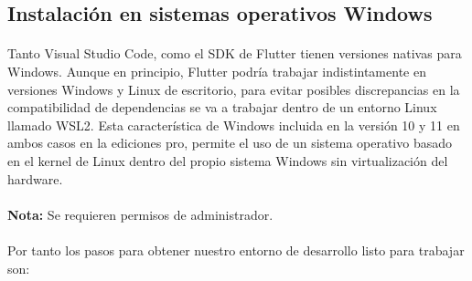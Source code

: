 \subsection{Instalación en sistemas operativos Windows}

\paragraph{}Tanto Visual Studio Code, como el \gls{SDK} de Flutter tienen versiones
nativas para Windows. Aunque en principio, Flutter podría trabajar indistintamente en
versiones Windows y Linux de escritorio, para evitar posibles discrepancias en la
compatibilidad de dependencias se va a trabajar dentro de un entorno Linux llamado
\gls{WSL2}. Esta característica de Windows incluida en la versión 10 y 11 en ambos
casos en la ediciones pro, permite el uso de un sistema operativo basado en el kernel
de Linux dentro del propio sistema Windows sin virtualización del hardware.

\paragraph{}\textbf{Nota:} Se requieren permisos de administrador.

\paragraph{}Por tanto los pasos para obtener nuestro entorno de desarrollo listo para
trabajar son:

